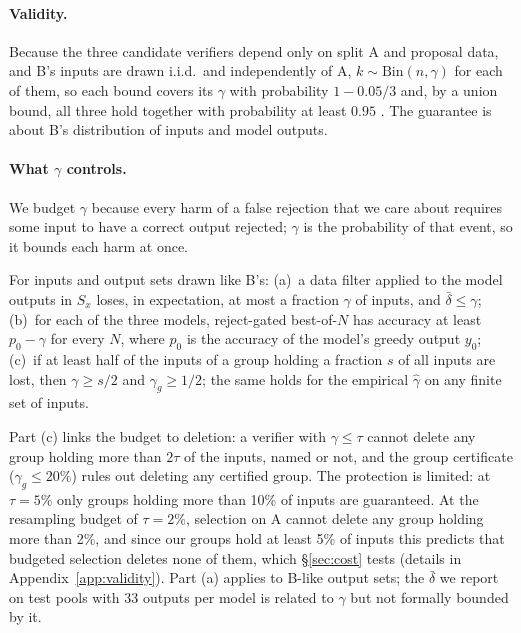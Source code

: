 \documentclass[11pt]{article}
\begin{document}
\paragraph{Validity.} Because the three candidate verifiers depend only
on split A and proposal data, and B's inputs are drawn i.i.d.\ and
independently of A, $k\sim\mathrm{Bin}(n,\gamma)$ for each of them, so each
bound covers its $\gamma$ with probability $1-0.05/3$ and, by a union bound,
all three hold together with probability at least $0.95$
\citep{clopper1934}. The guarantee is about B's distribution of inputs and
model outputs.

\paragraph{What $\gamma$ controls.} We budget $\gamma$ because every harm
of a false rejection that we care about requires some input to have a
correct output rejected; $\gamma$ is the probability of that event, so it
bounds each harm at once.

\begin{proposition}\label{prop:coverage}
For inputs and output sets drawn like B's:
(a)~a data filter applied to the model outputs in $S_x$ loses, in
expectation, at most a fraction $\gamma$ of inputs, and $\bar\delta\le\gamma$;
(b)~for each of the three models, reject-gated best-of-$N$ has accuracy at
least $p_0-\gamma$ for every $N$, where $p_0$ is the accuracy of the
model's greedy output $y_0$;
(c)~if at least half of the inputs of a group holding a fraction $s$ of
all inputs are lost, then $\gamma\ge s/2$ and $\gamma_g\ge 1/2$; the same
holds for the empirical $\hat\gamma$ on any finite set of inputs.
\end{proposition}

\noindent Part (c) links the budget to deletion: a verifier with
$\gamma\le\tau$ cannot delete any group holding more than $2\tau$ of the
inputs, named or not, and the group certificate ($\gamma_g\le20\%$) rules
out deleting any certified group. The protection is limited: at
$\tau=5\%$ only groups holding more than 10\% of inputs are guaranteed.
At the resampling budget of $\tau=2\%$, selection on A cannot delete any
group holding more than 2\%, and since our groups hold at least 5\% of
inputs this predicts that budgeted selection deletes none of them, which
\S\ref{sec:cost} tests (details in Appendix~\ref{app:validity}). Part (a) applies to
B-like output sets; the $\bar\delta$ we report on test pools with 33
outputs per model is related to $\gamma$ but not formally bounded by it.
\end{document}
